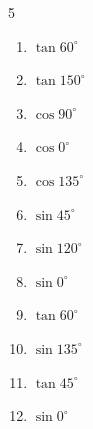 \begin{multicols}{5}
\begin{enumerate}
        \phantom{$\displaystyle =0$}

  \item $\displaystyle \tan{60^\circ}$


  \item $\displaystyle \tan{150^\circ}$


\columnbreak %

  \item $\displaystyle \cos{90^\circ}$

        \phantom{$\displaystyle =0$}

  \item $\displaystyle \cos{0^\circ}$

        \phantom{$\displaystyle =1$}

  \item $\displaystyle \cos{135^\circ}$


  \item $\displaystyle \sin{45^\circ}$


  \item $\displaystyle \sin{120^\circ}$


  \item $\displaystyle \sin{0^\circ}$

        \phantom{$\displaystyle =0$}

  \item $\displaystyle \tan{60^\circ}$


  \item $\displaystyle \sin{135^\circ}$


  \item $\displaystyle \tan{45^\circ}$

        \phantom{$\displaystyle =1$}

  \item $\displaystyle \sin{0^\circ}$

        \phantom{$\displaystyle =0$}


\end{enumerate}
\end{multicols}
